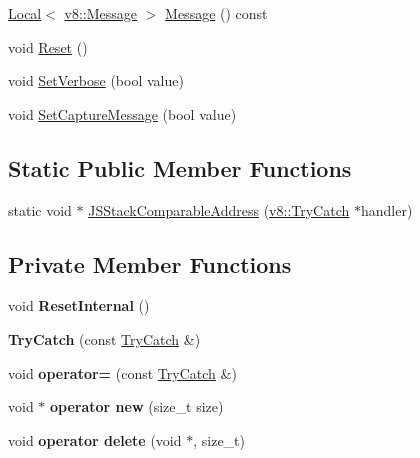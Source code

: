 \begin{DoxyCompactItemize}
\item 
\hyperlink{classv8_1_1_local}{Local}$<$ \hyperlink{classv8_1_1_message}{v8\+::\+Message} $>$ \hyperlink{classv8_1_1_try_catch_af44ef49d5a6ea6290b6527bbc743929a}{Message} () const 
\item 
void \hyperlink{classv8_1_1_try_catch_a3aae8acab4c99b374b7d782763d4c8e1}{Reset} ()
\item 
void \hyperlink{classv8_1_1_try_catch_a032cd889d76bd596e2616df11ced8682}{Set\+Verbose} (bool value)
\item 
void \hyperlink{classv8_1_1_try_catch_a541b8fa6951bd5a439692c22d5c7b73c}{Set\+Capture\+Message} (bool value)
\end{DoxyCompactItemize}
\subsection*{Static Public Member Functions}
\begin{DoxyCompactItemize}
\item 
static void $\ast$ \hyperlink{classv8_1_1_try_catch_ac2e6359fa11a2aba609af82fb80cf07a}{J\+S\+Stack\+Comparable\+Address} (\hyperlink{classv8_1_1_try_catch}{v8\+::\+Try\+Catch} $\ast$handler)
\end{DoxyCompactItemize}
\subsection*{Private Member Functions}
\begin{DoxyCompactItemize}
\item 
void {\bfseries Reset\+Internal} ()\hypertarget{classv8_1_1_try_catch_ae0c8d52ffa44aaae9f9ed6aed8571aa6}{}\label{classv8_1_1_try_catch_ae0c8d52ffa44aaae9f9ed6aed8571aa6}

\item 
{\bfseries Try\+Catch} (const \hyperlink{classv8_1_1_try_catch}{Try\+Catch} \&)\hypertarget{classv8_1_1_try_catch_a2ef3ec2db82538e0ff5540afe0f3660e}{}\label{classv8_1_1_try_catch_a2ef3ec2db82538e0ff5540afe0f3660e}

\item 
void {\bfseries operator=} (const \hyperlink{classv8_1_1_try_catch}{Try\+Catch} \&)\hypertarget{classv8_1_1_try_catch_aee3add8ba92eff66fdb22af91fce847d}{}\label{classv8_1_1_try_catch_aee3add8ba92eff66fdb22af91fce847d}

\item 
void $\ast$ {\bfseries operator new} (size\+\_\+t size)\hypertarget{classv8_1_1_try_catch_abe99b582257e711aa72730ddf6661100}{}\label{classv8_1_1_try_catch_abe99b582257e711aa72730ddf6661100}

\item 
void {\bfseries operator delete} (void $\ast$, size\+\_\+t)\hypertarget{classv8_1_1_try_catch_ad400a5dc4796e85d3d97a0e612adf0f8}{}\label{classv8_1_1_try_catch_ad400a5dc4796e85d3d97a0e612adf0f8}

\end{DoxyCompactItemize}
